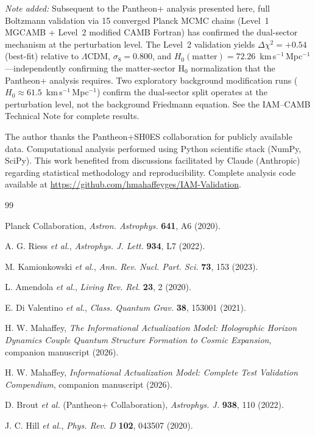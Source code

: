 \documentclass[twocolumn,superscriptaddress,prd,amsmath,amssymb]{revtex4-2}
\begin{document}
\textit{Note added:} Subsequent to the Pantheon+ analysis presented here, full Boltzmann validation via 15 converged Planck MCMC chains (Level~1 MGCAMB + Level~2 modified CAMB Fortran) has confirmed the dual-sector mechanism at the perturbation level. The Level~2 validation yields $\Delta\chi^2 = +0.54$ (best-fit) relative to $\Lambda$CDM, $\sigma_8 = 0.800$, and $H_0(\mathrm{matter}) = 72.26$~km\,s$^{-1}$\,Mpc$^{-1}$---independently confirming the matter-sector H$_0$ normalization that the Pantheon+ analysis requires. Two exploratory background modification runs ($H_0 \approx 61.5$~km\,s$^{-1}$\,Mpc$^{-1}$) confirm the dual-sector split operates at the perturbation level, not the background Friedmann equation. See the IAM--CAMB Technical Note for complete results.

\begin{acknowledgments}
The author thanks the Pantheon+SH0ES collaboration for publicly available data. Computational analysis performed using Python scientific stack (NumPy, SciPy). This work benefited from discussions facilitated by Claude (Anthropic) regarding statistical methodology and reproducibility. Complete analysis code available at \url{https://github.com/hmahaffeyges/IAM-Validation}.
\end{acknowledgments}

\begin{thebibliography}{99}

Planck Collaboration,
\textit{Astron. Astrophys.} \textbf{641}, A6 (2020).

A. G. Riess \textit{et al.},
\textit{Astrophys. J. Lett.} \textbf{934}, L7 (2022).

M. Kamionkowski \textit{et al.},
\textit{Ann. Rev. Nucl. Part. Sci.} \textbf{73}, 153 (2023).

L. Amendola \textit{et al.},
\textit{Living Rev. Rel.} \textbf{23}, 2 (2020).

E. Di Valentino \textit{et al.},
\textit{Class. Quantum Grav.} \textbf{38}, 153001 (2021).

H. W. Mahaffey,
\textit{The Informational Actualization Model: Holographic Horizon Dynamics Couple Quantum Structure Formation to Cosmic Expansion},
companion manuscript (2026).

H. W. Mahaffey,
\textit{Informational Actualization Model: Complete Test Validation Compendium},
companion manuscript (2026).

D. Brout \textit{et al.} (Pantheon+ Collaboration),
\textit{Astrophys. J.} \textbf{938}, 110 (2022).

J. C. Hill \textit{et al.},
\textit{Phys. Rev. D} \textbf{102}, 043507 (2020).

\end{thebibliography}
\end{document}
